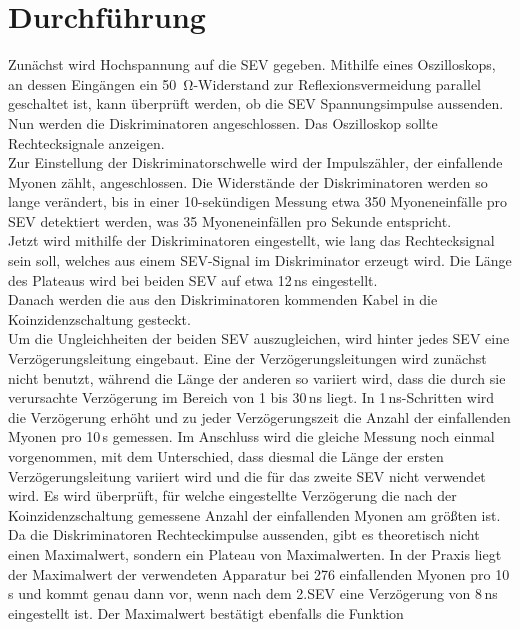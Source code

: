   \section{Durchführung}

    Zunächst wird Hochspannung auf die SEV gegeben. Mithilfe eines
    Oszilloskops, an dessen Eingängen ein \SI{50}{\ohm}-Widerstand zur
    Reflexionsvermeidung parallel geschaltet ist, kann überprüft werden, ob die
    SEV Spannungsimpulse aussenden.\\
    Nun werden die Diskriminatoren angeschlossen. Das Oszilloskop
    sollte Rechtecksignale anzeigen.\\
    Zur Einstellung der Diskriminatorschwelle wird der
    Impulszähler, der einfallende Myonen zählt, angeschlossen.
    Die Widerstände der Diskriminatoren werden so lange verändert, bis in einer
    10-sekündigen Messung etwa 350 Myoneneinfälle pro SEV detektiert werden,
    was 35 Myoneneinfällen pro Sekunde entspricht.\\
    Jetzt wird mithilfe der Diskriminatoren eingestellt,
    wie lang das Rechtecksignal sein soll, welches aus einem SEV-Signal
    im Diskriminator erzeugt wird. Die Länge des Plateaus wird bei
    beiden SEV auf etwa 12\,ns eingestellt.\\
    Danach werden die aus den Diskriminatoren kommenden Kabel
    in die Koinzidenzschaltung gesteckt.\\
    Um die Ungleichheiten der beiden SEV auszugleichen, wird hinter
    jedes SEV eine Verzögerungsleitung eingebaut. Eine der Verzögerungsleitungen
    wird zunächst nicht benutzt, während die Länge der anderen so
    variiert wird,
    dass die durch sie verursachte Verzögerung im Bereich von 1 bis 30\,ns
    liegt. In 1\,ns-Schritten wird die Verzögerung erhöht und zu jeder
    Verzögerungszeit die Anzahl der einfallenden Myonen pro 10\,s gemessen.
    Im Anschluss wird die gleiche Messung noch einmal vorgenommen,
    mit dem Unterschied, dass diesmal die Länge der ersten Verzögerungsleitung
    variiert wird und die für das zweite SEV nicht verwendet wird.
    Es wird überprüft, für welche eingestellte Verzögerung die nach der
    Koinzidenzschaltung gemessene Anzahl der einfallenden Myonen am größten ist.
    Da die Diskriminatoren Rechteckimpulse aussenden, gibt es theoretisch nicht
    einen Maximalwert, sondern ein Plateau von Maximalwerten. In der
    Praxis liegt der Maximalwert der verwendeten Apparatur bei 276 einfallenden
    Myonen pro 10\,s und kommt genau dann vor, wenn nach dem 2.SEV eine Verzögerung
    von 8\,ns eingestellt ist. Der Maximalwert bestätigt ebenfalls die Funktion
